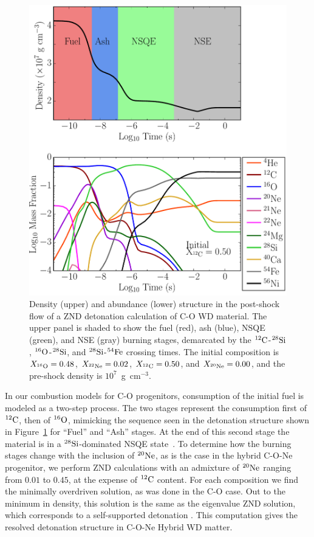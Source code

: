 \documentclass[iop,apj]{emulateapj}
\newcommand{\C}[1]{\ensuremath{{}^{#1}{\rm C}}}
\newcommand{\Ox}[1]{\ensuremath{{}^{#1}{\rm O}}}
\newcommand{\Ne}[1]{\ensuremath{{}^{#1}{\rm Ne}}}
\newcommand{\Si}[1]{\ensuremath{{}^{#1}{\rm Si}}}
\newcommand{\Fe}[1]{\ensuremath{{}^{#1}{\rm Fe}}}
\begin{document}
\begin{figure}[t]
  \includegraphics[width=\linewidth]{figures/detonation_plotfiles/Composition_Density_vs_Time.pdf}
	\caption{\label{fig:co_znd_stages} Density (upper) and
          abundance (lower) structure in the post-shock flow of a ZND
          detonation calculation of C-O WD material. The upper panel is shaded to show
          the fuel (red), ash (blue), NSQE (green), and NSE (gray) burning stages, demarcated by the \C{12}-\Si{28}, \Ox{16}-\Si{28}, and
          \Si{28}-\Fe{54} crossing times. The initial composition is
          $X_{^{16}\rm O} = 0.48$, $X_{^{22}\rm Ne} = 0.02$,
          $X_{^{12}\rm C} = 0.50$, and $X_{^{20}\rm Ne} = 0.00$, and
          the pre-shock density is $10^7$~g~cm$^{-3}$.}
\end{figure}


In our combustion models for C-O progenitors, consumption of the
initial fuel is modeled as a two-step process. The two stages
represent the consumption first of \C{12}, then of \Ox{16}, mimicking
the sequence seen in the detonation structure shown in
Figure~\ref{fig:co_znd_stages} for ``Fuel'' and ``Ash'' stages. At the
end of this second stage the material is in a \Si{28}-dominated NSQE
state~\citep{Caldetal07,townsley.calder.ea:flame}. To determine how
the burning stages change with the inclusion of \Ne{20}, as is the
case in the hybrid C-O-Ne progenitor, we perform ZND calculations with
an admixture of \Ne{20} ranging from $0.01$ to $0.45$, at the expense
of \C{12} content. For each composition we find the minimally
overdriven solution, as was done in the C-O case. Out to the minimum
in density, this solution is the same as the eigenvalue ZND solution,
which corresponds to a self-supported detonation \citep{FickDavi79,townetal15}.
This computation gives the resolved detonation structure in C-O-Ne Hybrid WD matter.
\end{document}
